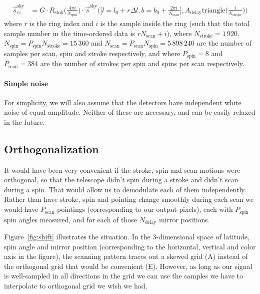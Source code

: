 \documentclass{article}
\begin{document}
\begin{align}
	\vec s^\textrm{sky}_{ri} &= G \cdot
		R_\textrm{stok}\Big(\frac{4\pi i}{N_\textrm{spin}}\Big) \cdot
		\vec s^\textrm{sky}\Big(\Big[l=l_0+r\Delta l,b=b_0+\frac{2\pi i}{N_\textrm{scan}}\Big],
		A_\textrm{delay}\textrm{triangle}\Big(\frac{i}{N_\textrm{stroke}}\Big)\Big)
		\label{eq:sring}
\end{align}
where $r$ is the ring index and $i$ is the sample inside the ring (such
that the total sample number in the time-ordered data is $rN_\textrm{scan}+i$),
where $N_\textrm{stroke} = 1\,920$, $N_\textrm{spin} = P_\textrm{spin}N_\textrm{stroke}
= 15\,360$ and $N_\textrm{scan} = P_\textrm{scan}N_\textrm{spin} = 5\,898\,240$
are the number of samples per scan, spin and stroke respectively, and where
$P_\textrm{spin} = 8$ and $P_\textrm{scan} = 384$ are the number of
strokes per spin and spins per scan respectively.

\paragraph{Simple noise}
For simplicity, we will also assume that the detectors have independent white
noise of equal amplitude. Neither of these are necessary, and can be easily
relaxed in the future.

\subsection{Orthogonalization}
\label{sect:ortho}
It would have been very convenient if the stroke, spin and scan motions were
orthogonal, so that the telescope didn't spin during a stroke and didn't scan
during a spin. That would allow us to demodulate each of them independently.
Rather than have stroke, spin and pointing change smoothly during each scan
we would have $P_\textrm{scan}$ pointings (corresponding
to our output pixels), each with
$P_\textrm{spin}$ spin angles measured, and for each
of those $N_\textrm{delay}$ mirror positions.

Figure~\ref{fig:shift} illustrates the situation. In the 3-dimensional
space of latitude, spin angle and mirror position (corresponding to the
horizontal, vertical and color axis in the figure), the scanning pattern
traces out a skewed grid (A) instead of the orthogonal grid
that would be convenient (E). However, as long as our signal is well-sampled
in all directions in the grid we can use the samples we have to
interpolate to orthogonal grid we wish we had.
\end{document}

